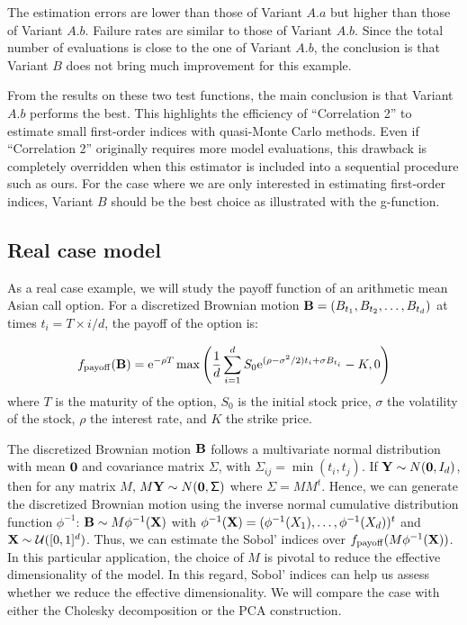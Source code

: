 The estimation errors are lower than those of Variant $A.a$ but higher than those of Variant $A.b$. Failure rates are similar to those of Variant $A.b$. Since the total number of evaluations is close to the one of Variant $A.b$, the conclusion is that Variant $B$ does not bring much improvement for this example.
\bigskip

From the results on these two test functions, the main conclusion is that Variant $A.b$ performs the best. This highlights the efficiency of ``Correlation 2'' to estimate small first-order indices with quasi-Monte Carlo methods. Even if ``Correlation 2'' originally requires more model evaluations, this drawback is completely overridden when this estimator is included into a sequential procedure such as ours. For the case where we are only interested in estimating first-order indices, Variant $B$ should be the best choice as illustrated with the g-function.

\subsection{Real case model}
\label{sec:5.2}

As a real case example, we will study the payoff function of an arithmetic mean Asian call option. For a discretized Brownian motion $\boldsymbol{\mathbf{B}}=(B_{t_1}, B_{t_2},\dots, B_{t_d})$ at times $t_i=T\times i/d$, the payoff of the option is:

\[
f_{\rm payoff}(\boldsymbol{\mathbf{B}}) = \text{e}^{-\rho T}\max\left(\frac{1}{d}\sum_{i=1}^d S_0\text{e}^{(\rho-\sigma^2/2)t_i+\sigma B_{t_i}}-K, 0\right)
\]
where $T$ is the maturity of the option, $S_0$ is the initial stock price, $\sigma$ the volatility of the stock, $\rho$ the interest rate, and $K$ the strike price.

The discretized Brownian motion $\boldsymbol{\mathbf{B}}$ follows a multivariate normal distribution with mean $\boldsymbol{\mathbf{0}}$ and covariance matrix $\mathsf{\Sigma}$, with $\mathsf{\Sigma}_{ij}=\min(t_i,t_j)$. If $\boldsymbol{\mathbf{Y}}\sim N(\boldsymbol{\mathbf{0}},I_d)$, then for any matrix $M$, $M\boldsymbol{\mathbf{Y}}\sim N(\boldsymbol{\mathbf{0}},\mathsf{\Sigma})$ where $\mathsf{\Sigma}=MM^t$. Hence, we can generate the discretized Brownian motion using the inverse normal cumulative distribution function $\phi^{-1}$: $\boldsymbol{\mathbf{B}}\sim M\phi^{-1}(\boldsymbol{\mathbf{X}})$ with $\phi^{-1}(\boldsymbol{\mathbf{X}})=(\phi^{-1}(X_1),\dots,\phi^{-1}(X_d))^t$ and $\boldsymbol{\mathbf{X}}\sim \mathcal{U}([0,1]^d)$. Thus, we can estimate the Sobol' indices over $f_{\rm payoff}(M\phi^{-1}(\boldsymbol{\mathbf{X}}))$. In this particular application, the choice of $M$ is pivotal to reduce the effective dimensionality of the model. In this regard, Sobol' indices can help us assess whether we reduce the effective dimensionality. We will compare the case with either the Cholesky decomposition or the PCA construction.

